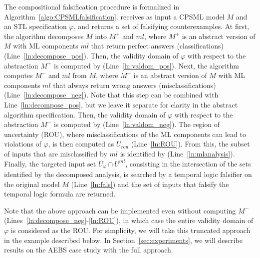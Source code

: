 The compositional falsification procedure is formalized in Algorithm~\ref{algo:CPSMLfalsification}.
 receives as input a CPSML model $M$ and 
an STL specification $\varphi$, and returns a set of falsifying counterexamples.
At first, the algorithm decomposes $M$ into $M^+$ and $ml$, where $M^+$ is an abstract version of $M$ with ML components $ml$ that return perfect answers (classifications) (Line~\ref{ln:decompose_pos}).
Then, the validity domain of $\varphi$ with respect to the abstraction $M^+$ is computed 
by  (Line~\ref{ln:valdom_pos}).
Next, the algorithm computes $M^-$ and $ml$ from $M$, where $M^-$ is an abstract version of $M$ with ML components $ml$ that always return wrong answers (misclassifications) (Line~\ref{ln:decompose_neg}).
Note that this step can be combined with Line~\ref{ln:decompose_pos},
but we leave it separate for clarity in the abstract algorithm specification.
Then, the validity domain of $\varphi$ with respect to the abstraction $M^-$ is computed 
by  (Line~\ref{ln:valdom_neg}).
The region of uncertainty (ROU), where misclassifications of the
ML components can lead to violations of $\varphi$,
is then computed as $U_{rou}$ (Line~\ref{ln:ROU}).
From this, the subset of inputs that are misclassified by 
$ml$ is identified by  (Line~\ref{ln:mlanalysis}).
Finally, the targeted input set $U_\varphi \cap U^{ml}$,
consisting in the intersection of the sets identified by the decomposed 
analysis, is searched by a temporal logic falsifier on the original model $M$ (Line~\ref{ln:fals})
and the set of inputs that falsify the temporal logic formula
are returned.

Note that the above approach can be implemented even without 
computing $M^-$ (Lines~\ref{ln:decompose_neg}-\ref{ln:ROU}), 
in which case the entire validity domain of $\varphi$ is considered
as the ROU. For simplicity, we will take this truncated approach
in the example described below. In Section~\ref{sec:experiments},
we will describe results on the AEBS case study with the full approach.


